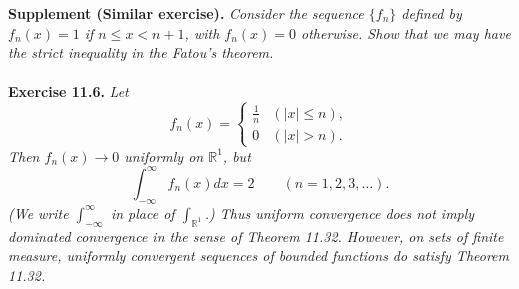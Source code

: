 \documentclass{article}
\begin{document}
\textbf{Supplement (Similar exercise).}
  \emph{Consider the sequence $\{f_n\}$ defined by $f_n(x) = 1$ if $n \leq x < n+1$,
  with $f_n(x) = 0$ otherwise.
  Show that we may have the strict inequality in the Fatou's theorem.} \\\\






\textbf{Exercise 11.6.}
\emph{Let
\begin{equation*}
f_n(x) =
  \begin{cases}
    \frac{1}{n}
      & (|x| \leq n), \\
    0
      & (|x| > n).
  \end{cases}
\end{equation*}
Then $f_n(x) \to 0$ uniformly on $\mathbb{R}^1$,
but
\[
  \int_{-\infty}^{\infty} f_n(x) dx = 2
  \qquad
  (n = 1,2,3,\ldots).
\]
(We write $\int_{-\infty}^{\infty}$ in place of $\int_{\mathbb{R}^1}$.)
Thus uniform convergence does not imply dominated convergence
in the sense of Theorem 11.32.
However, on sets of finite measure,
uniformly convergent sequences of bounded functions do satisfy Theorem 11.32.} \\
\end{document}
